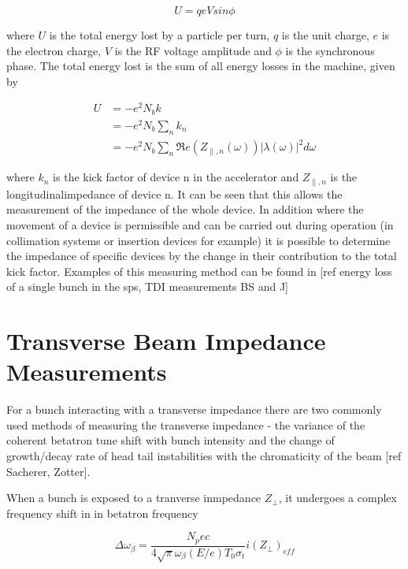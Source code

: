 \begin{equation}
U = qeVsin\phi
\end{equation}

where $U$ is the total energy lost by a particle per turn, $q$ is the unit charge, $e$ is the electron charge, $V$ is the RF voltage amplitude and $\phi$ is the synchronous phase. The total energy lost is the sum of all energy losses in the machine, given by

\begin{align}
U & = -e^{2}N_{b}k \\
   & = -e^{2}N_{b}\displaystyle\sum\limits_{n} k_{n} \\
   & = -e^{2}N_{b}\displaystyle\sum\limits_{n} \Re{}e\left( Z_{\parallel,n}\left( \omega \right) \right)\left| \lambda \left( \omega \right) \right|^{2} d\omega
\end{align}

where $k_{n}$ is the kick factor of device n in the accelerator and $ Z_{\parallel,n}$ is the longitudinalimpedance of device n. It can be seen that this allows the measurement of the impedance of the whole device. In addition where the movement of a device is permissible and can be carried out during operation (in collimation systems or insertion devices for example) it is possible to determine the impedance of specific devices by the change in their contribution to the total kick factor. Examples of this measuring method can be found in [ref energy loss of a single bunch in the sps, TDI measurements BS and J]

\section{Transverse Beam Impedance Measurements}


For a bunch interacting with a transverse impedance there are two commonly used methods of measuring the transverse impedance - the variance of the coherent betatron tune shift with bunch intensity and the change of growth/decay rate of head tail instabilities with the chromaticity of the beam [ref Sacherer, Zotter].

When a bunch is exposed to a tranverse inmpedance $Z_{\perp}$, it undergoes a complex frequency shift in in betatron frequency


\begin{equation}
\Delta{}\omega_{\beta} = \frac{N_{p}ec}{4\sqrt{\pi}\omega_{\beta} \left( E/e \right)T_{0}\sigma_{t}} i\left( Z_{\perp} \right)_{eff}
\label{eqn:complex_tun_shift}
\end{equation}

